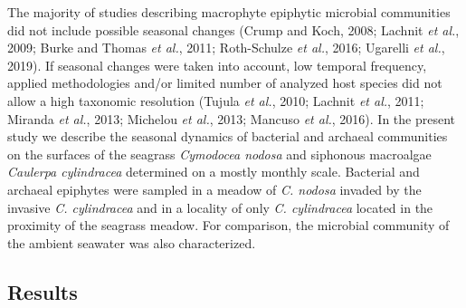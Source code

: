 \documentclass[12pt,]{article}
\begin{document}
The majority of studies describing macrophyte epiphytic microbial
communities did not include possible seasonal changes (Crump and Koch,
2008; Lachnit \emph{et al.}, 2009; Burke and Thomas \emph{et al.}, 2011;
Roth-Schulze \emph{et al.}, 2016; Ugarelli \emph{et al.}, 2019). If
seasonal changes were taken into account, low temporal frequency,
applied methodologies and/or limited number of analyzed host species did
not allow a high taxonomic resolution (Tujula \emph{et al.}, 2010;
Lachnit \emph{et al.}, 2011; Miranda \emph{et al.}, 2013; Michelou
\emph{et al.}, 2013; Mancuso \emph{et al.}, 2016). In the present study
we describe the seasonal dynamics of bacterial and archaeal communities
on the surfaces of the seagrass \emph{Cymodocea nodosa} and siphonous
macroalgae \emph{Caulerpa cylindracea} determined on a mostly monthly
scale. Bacterial and archaeal epiphytes were sampled in a meadow of
\emph{C. nodosa} invaded by the invasive \emph{C. cylindracea} and in a
locality of only \emph{C. cylindracea} located in the proximity of the
seagrass meadow. For comparison, the microbial community of the ambient
seawater was also characterized.

\newpage

\hypertarget{results}{%
\subsection{Results}\label{results}}
\end{document}
